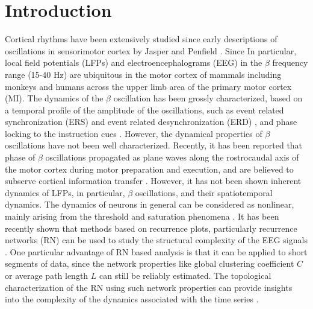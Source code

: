\documentclass[letterpaper, 9pt, conference]{ieeeconf}
\begin{document}
\section{Introduction}
Cortical rhythms have been extensively studied since early descriptions of oscillations in sensorimotor cortex by Jasper and Penfield \cite{jasper1949}. Since In particular, local field potentials (LFPs) and electroencephalograms (EEG) in the $\beta$ frequency range (15-40 Hz) are ubiquitous in the motor cortex of mammals including monkeys and humans across the upper limb area of the primary motor cortex (MI). The dynamics of the $\beta$ oscillation has been grossly characterized, based on a temporal profile of the amplitude of the oscillations, such as event related synchronization (ERS) and event related desynchronization (ERD) \cite{neuper2001, Jurkiewicz20061281}, and phase locking to the instruction cues \cite{jake2011}. However, the dynamical properties of $\beta$ oscillations have not been well characterized. Recently, it has been reported that phase of $\beta$ oscillations propagated as plane waves along the rostrocaudal axis of the motor cortex during motor preparation and execution, and are believed to subserve cortical information transfer \cite{doug2006betawave}. However, it has not been shown inherent dynamics of LFPs, in particular, $\beta$ oscillations, and their spatiotemporal dynamics. The dynamics of neurons in general can be considered as nonlinear, mainly arising from the threshold and saturation phenomena \cite{andrzejak2001indications}. It has been recently shown that methods based on recurrence plots, particularly recurrence networks (RN) can be used to study the structural complexity of the EEG signals \cite{subramaniyam2014characterization, subramaniyam2013analysis}. One particular advantage of  RN based analysis is that it can be applied to short segments of data, since the network properties like global clustering coefficient $C$ or average path length $L$ can still be reliably estimated. The topological characterization of the RN using such network properties can provide insights into the complexity of the dynamics associated with the time series \cite{donner2010recurrence}.



\end{document}

